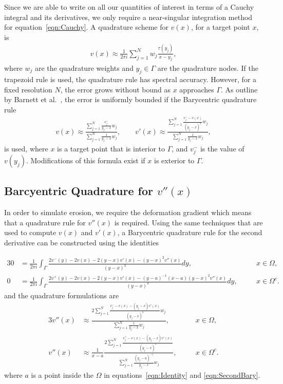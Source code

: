 \documentclass[preprint, 10pt]{elsarticle}
\begin{document}
Since we are able to write on all our quantities of interest in terms of
a Cauchy integral and its derivatives, we only require a near-singular
integration method for equation~\eqref{eqn:Cauchy}.  A quadrature scheme
for $v(x)$, for a target point $x$, is
\begin{align}
  v(x) \approx \frac{1}{2\pi i} \sum_{j=1}^N 
    w_j \frac{\tau(y_j)}{x - y_j},
\end{align}
where $w_j$ are the quadrature weights and $y_j \in \Gamma$ are the
quadrature nodes.  If the trapezoid rule is used, the quadrature rule
has spectral accuracy.  However, for a fixed resolution $N$, the error
grows without bound as $x$ approaches $\Gamma$.  As outline by Barnett
et al.~\cite{bar-wu-vee2015}, the error is uniformly bounded if the
Barycentric quadrature rule
\begin{align}
  v(x) \approx \frac{\sum\limits_{j=1}^N \frac{v_j^-}{y_j-x}w_j}
    {\sum\limits_{j=1}^N \frac{1}{y_j-x}w_j},  \qquad
  v'(x) \approx \frac{\sum\limits_{j=1}^N \frac{v_j^- - v(x)}{(y_j - x)^2}w_j}
    {\sum\limits_{j=1}^N \frac{1}{y_j-x}w_j}, 
\end{align}
is used, where $x$ is a target point that is interior to $\Gamma$,
and $v_j^-$ is the value of $v(y_j)$.  Modifications of this formula
exist if $x$ is exterior to $\Gamma$.

\subsection{Barcyentric Quadrature for $v''(x)$}
In order to simulate erosion, we require the deformation gradient which
means that a quadrature rule for $v''(x)$ is required.  Using the same
techniques that are used to compute $v(x)$ and $v'(x)$, a Barycentric
quadrature rule for the second derivative can be constructed using the
identities
{\color{red}
\begin{alignat}{3}
  0 &= \frac{1}{2\pi i}\int_{\Gamma} 
    \frac{2v^-({ y})-2v(x)-2(y-x)v'(x)-(y-x)^2v''(x)}{(y-x)^3} dy, &&x \in \Omega, \\
  0 &= \frac{1}{2\pi i}\int_{\Gamma}
    \frac{2v^+(y)-2v(x)-2(y-x)v'(x)-(y-a)^{-1}(x-a)(y-x)^2 v''(x)}
    {(y-x)^3} dy, \quad &&x \in \Omega^c.  \label{eqn:Identity}
\end{alignat}
and the quadrature formulations are
\begin{alignat}{3}
  v''(x) &\approx
    \frac{2\sum\limits_{j=1}^N \frac{v_j^- -v(x)-(y_j-x)v'(x)}{(y_j-x)^3}w_j}
    {\sum\limits_{j=1}^N \frac{1}{y_j-x}w_j}, &&x \in \Omega, \\
  v''(x) &\approx \frac{1}{x-a}\frac{2\sum\limits_{j=1}^N
    \frac{v_j^+ -v(x)-(y_j-x)v'(x)}{(y_j-x)^3}}{\sum\limits_{j=1}^N \frac{(y_j-a)^{-1}}{y_j-x}w_j}
    , \quad &&x \in \Omega^c.  \label{eqn:SecondBary}
\end{alignat}
where $a$ is a point inside the $\Omega$ in equations~\eqref{eqn:Identity} and \eqref{eqn:SecondBary}.

}
\end{document}
